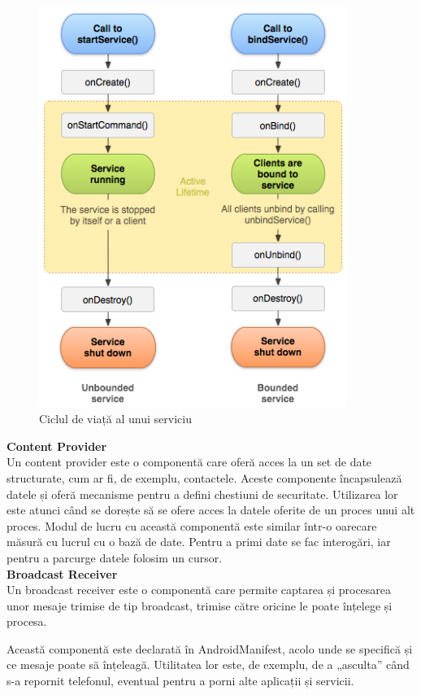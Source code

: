 \documentclass[12pt, a4paper, oneside]{article}
\begin{document}
\begin{figure}[h]
\centering
\includegraphics[width=10cm]{figures/service_lifecycle.png}
\caption{Ciclul de viață al unui serviciu}
\label{fig:service_lifecycle}
\end{figure}

\textbf{Content Provider}\\
Un content provider este o componentă care oferă acces la un set de date structurate, cum ar fi, de exemplu, contactele. Aceste componente încapsulează datele și oferă mecanisme pentru a defini chestiuni de securitate. Utilizarea lor este atunci când se dorește să se ofere acces la datele oferite de un proces unui alt proces.
Modul de lucru cu această componentă este similar într-o oarecare măsură cu lucrul cu o bază de date. Pentru a primi date se fac interogări, iar pentru a parcurge datele folosim un cursor.\\

\textbf{Broadcast Receiver}\\
Un broadcast receiver este o componentă care permite captarea și procesarea unor mesaje trimise de tip broadcast, trimise către oricine le poate înțelege și procesa.

Această componentă este declarată în AndroidManifest, acolo unde se specifică și ce mesaje poate să înțeleagă. Utilitatea lor este, de exemplu, de a „asculta” când s-a repornit telefonul, eventual pentru a porni alte aplicații și servicii.
\end{document}
